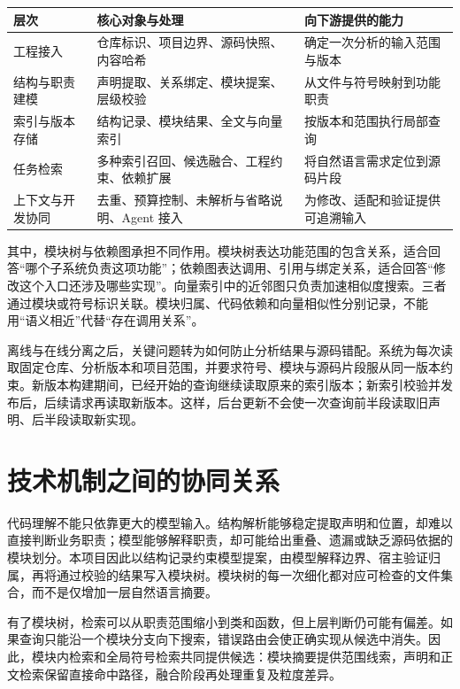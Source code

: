 \begin{center}\small
\begin{longtable}{P{0.19\textwidth}P{0.33\textwidth}P{0.38\textwidth}}
\toprule
层次 & 核心对象与处理 & 向下游提供的能力 \\
\midrule\endhead
工程接入 & 仓库标识、项目边界、源码快照、内容哈希 & 确定一次分析的输入范围与版本 \\
结构与职责建模 & 声明提取、关系绑定、模块提案、层级校验 & 从文件与符号映射到功能职责 \\
索引与版本存储 & 结构记录、模块结果、全文与向量索引 & 按版本和范围执行局部查询 \\
任务检索 & 多种索引召回、候选融合、工程约束、依赖扩展 & 将自然语言需求定位到源码片段 \\
上下文与开发协同 & 去重、预算控制、未解析与省略说明、Agent 接入 & 为修改、适配和验证提供可追溯输入 \\
\bottomrule
\end{longtable}\end{center}

其中，模块树与依赖图承担不同作用。模块树表达功能范围的包含关系，适合回答“哪个子系统负责这项功能”；依赖图表达调用、引用与绑定关系，适合回答“修改这个入口还涉及哪些实现”。向量索引中的近邻图只负责加速相似度搜索。三者通过模块或符号标识关联。模块归属、代码依赖和向量相似性分别记录，不能用“语义相近”代替“存在调用关系”。

离线与在线分离之后，关键问题转为如何防止分析结果与源码错配。系统为每次读取固定仓库、分析版本和项目范围，并要求符号、模块与源码片段服从同一版本约束。新版本构建期间，已经开始的查询继续读取原来的索引版本；新索引校验并发布后，后续请求再读取新版本。这样，后台更新不会使一次查询前半段读取旧声明、后半段读取新实现。

\section{技术机制之间的协同关系}

代码理解不能只依靠更大的模型输入。结构解析能够稳定提取声明和位置，却难以直接判断业务职责；模型能够解释职责，却可能给出重叠、遗漏或缺乏源码依据的模块划分。本项目因此以结构记录约束模型提案，由模型解释边界、宿主验证归属，再将通过校验的结果写入模块树。模块树的每一次细化都对应可检查的文件集合，而不是仅增加一层自然语言摘要。

有了模块树，检索可以从职责范围缩小到类和函数，但上层判断仍可能有偏差。如果查询只能沿一个模块分支向下搜索，错误路由会使正确实现从候选中消失。因此，模块内检索和全局符号检索共同提供候选：模块摘要提供范围线索，声明和正文检索保留直接命中路径，融合阶段再处理重复及粒度差异。

